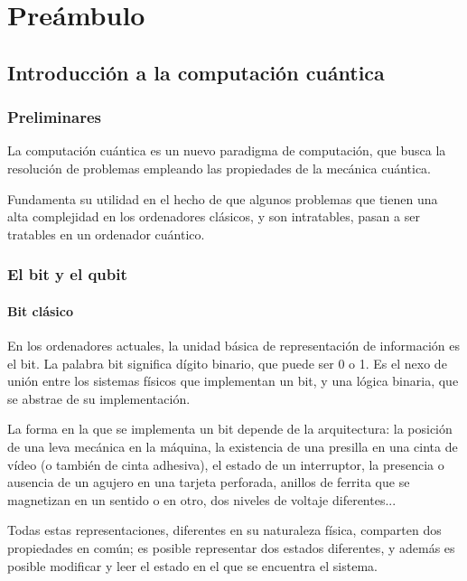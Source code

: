 \chapter{Preámbulo}
\section{Introducción a la computación cuántica}
\subsection{Preliminares}
La computación cuántica es un nuevo paradigma de computación, que busca la
resolución de problemas empleando las propiedades de la mecánica cuántica.

Fundamenta su utilidad en el hecho de que algunos problemas que tienen una alta
complejidad en los ordenadores clásicos, y son intratables, pasan a ser
tratables en un ordenador cuántico.

\subsection{El bit y el qubit}

\subsubsection{Bit clásico}
En los ordenadores actuales, la unidad básica de representación de información 
es el bit. La palabra bit significa dígito binario, que puede ser 0 o 1. Es el 
nexo de unión entre los sistemas físicos que implementan un bit, y una lógica 
binaria, que se abstrae de su implementación.

La forma en la que se implementa un bit depende de la arquitectura: la posición 
de una leva mecánica en la máquina, la existencia de una presilla en una cinta 
de vídeo (o también de cinta adhesiva), el estado de un interruptor, la 
presencia o ausencia de un agujero en una tarjeta perforada, anillos de ferrita 
que se magnetizan en un sentido o en otro, dos niveles de voltaje diferentes...

Todas estas representaciones, diferentes en su naturaleza física, comparten dos 
propiedades en común; es posible representar dos estados diferentes, y además es 
posible modificar y leer el estado en el que se encuentra el sistema.


